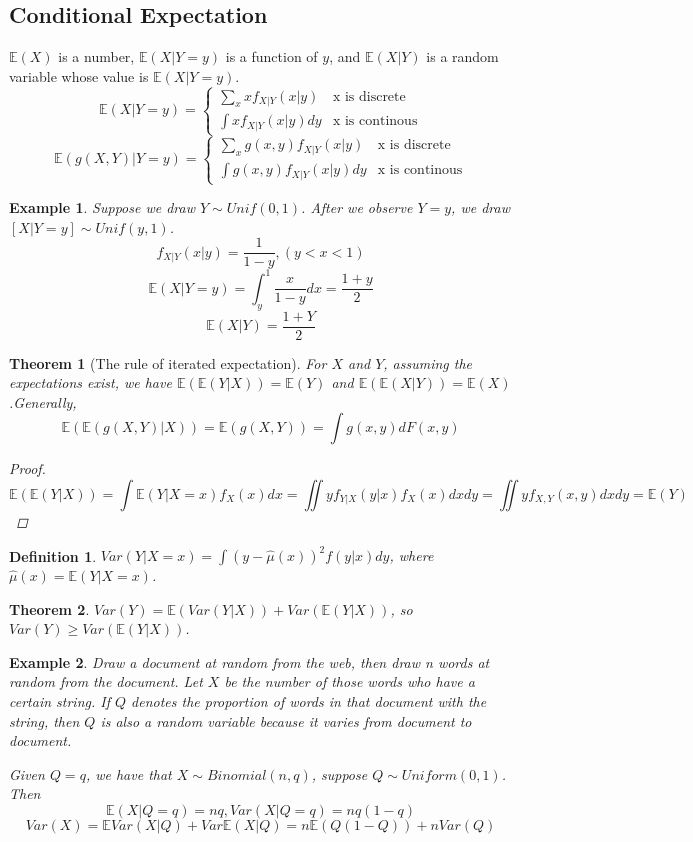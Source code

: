 \documentclass[11pt]{article}
\def\BE{{\mathbb E}}
\newtheorem{theorem}{Theorem}[section]
\newtheorem{definition}{Definition}[section]
\newtheorem{example}{Example}[section]
\begin{document}
\subsection{Conditional Expectation}
$\BE(X)$ is a number, $\BE(X|Y=y)$ is a function of $y$, and $\BE(X|Y)$ is a random variable whose value is $\BE(X|Y=y)$.
$$\BE(X|Y=y)=\begin{cases}\sum\limits_xxf_{X|Y}(x|y)  & \text{x is discrete} \\ \int xf_{X|Y}(x|y)dy & \text{x is continous} \end{cases}$$
$$\BE(g(X,Y)|Y=y)=\begin{cases}\sum\limits_xg(x,y)f_{X|Y}(x|y)  & \text{x is discrete} \\ \int g(x,y)f_{X|Y}(x|y)dy & \text{x is continous} \end{cases}$$
\begin{example}
Suppose we draw $Y\sim Unif(0,1)$. After we observe $Y=y$, we draw $[X|Y=y]\sim Unif(y,1)$.
$$f_{X|Y}(x|y)=\frac{1}{1-y}, (y<x<1)$$
$$\BE(X|Y=y)=\int_y^1\frac{x}{1-y}dx=\frac{1+y}{2}$$
$$\BE(X|Y)=\frac{1+Y}{2}$$
\end{example}
\begin{theorem}
[The rule of iterated expectation] For $X$ and $Y$, assuming the expectations exist, we have $\BE(\BE(Y|X))=\BE(Y)$ and $\BE(\BE(X|Y))=\BE(X)$.Generally, $$\BE(\BE(g(X,Y)|X))=\BE(g(X,Y))=\int g(x,y)dF(x,y)$$
\begin{proof}
$$\BE(\BE(Y|X))=\int\BE(Y|X=x)f_X(x)dx=\iint yf_{Y|X}(y|x)f_X(x)dxdy=\iint yf_{X,Y}(x,y)dxdy=\BE(Y)$$
\end{proof}
\end{theorem}
\begin{definition}
$Var(Y|X=x)=\int(y-\hat{\mu}(x))^2f(y|x)dy$, where $\hat{\mu}(x)=\BE(Y|X=x)$.
\end{definition}
\begin{theorem}
$Var(Y)=\BE(Var(Y|X))+Var(\BE(Y|X))$, so $Var(Y)\ge Var(\BE(Y|X))$.
\end{theorem}
\begin{example}
Draw a document at random from the web, then draw n words at random from the document. Let $X$ be the number of those words who have a certain string. If $Q$ denotes the proportion of words in that document with the string, then $Q$ is also a random variable because it varies from document to document. 

Given $Q=q$, we have that $X\sim Binomial(n,q)$, suppose $Q\sim Uniform(0,1)$. Then
$$\BE(X|Q=q)=nq, Var(X|Q=q)=nq(1-q)$$
$$Var(X)=\BE Var(X|Q)+Var\BE(X|Q)=n\BE(Q(1-Q))+nVar(Q)$$
\end{example}
\end{document}
